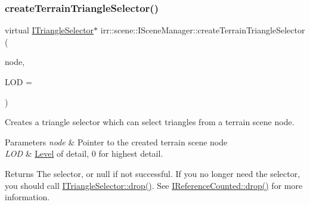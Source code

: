 \subsubsection{\texorpdfstring{create\+Terrain\+Triangle\+Selector()}{createTerrainTriangleSelector()}}
{\footnotesize\ttfamily virtual \hyperlink{classirr_1_1scene_1_1ITriangleSelector}{I\+Triangle\+Selector}$\ast$ irr\+::scene\+::\+I\+Scene\+Manager\+::create\+Terrain\+Triangle\+Selector (\begin{DoxyParamCaption}\item[{\hyperlink{classirr_1_1scene_1_1ITerrainSceneNode}{I\+Terrain\+Scene\+Node} $\ast$}]{node,  }\item[{\hyperlink{namespaceirr_ac66849b7a6ed16e30ebede579f9b47c6}{s32}}]{L\+OD = {} }\end{DoxyParamCaption})\hspace{0.3cm}{\ttfamily [pure virtual]}}



Creates a triangle selector which can select triangles from a terrain scene node. 


\begin{DoxyParams}{Parameters}
{\em node} & Pointer to the created terrain scene node \\
\hline
{\em L\+OD} & \hyperlink{classLevel}{Level} of detail, 0 for highest detail. \\
\hline
\end{DoxyParams}
\begin{DoxyReturn}{Returns}
The selector, or null if not successful. If you no longer need the selector, you should call \hyperlink{classirr_1_1IReferenceCounted_a03856a09355b89d178090c4a5f738543}{I\+Triangle\+Selector\+::drop()}. See \hyperlink{classirr_1_1IReferenceCounted_a03856a09355b89d178090c4a5f738543}{I\+Reference\+Counted\+::drop()} for more information. 
\end{DoxyReturn}
\mbox{\label{classirr_1_1scene_1_1ISceneManager_af50f3bdcefe2e7df979b86e297498c29}} 
